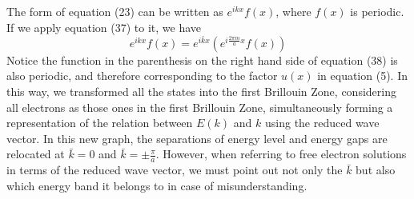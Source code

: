 \documentclass{article}
\begin{document}
The form of equation (23) can be written as $e^{ikx}f(x)$, where $f(x)$ is periodic. If we apply equation (37) to it, we have\begin{equation}
    e^{ikx}f(x)=e^{i\bar{k}x}(e^{i\frac{2\pi{m}}{a}x}f(x))
\end{equation}
Notice the function in the parenthesis on the right hand side of equation (38) is also periodic, and therefore corresponding to the factor $u(x)$ in equation (5). In this way, we transformed all the states into the first Brillouin Zone, considering all electrons as those ones in the first Brillouin Zone, simultaneously forming a representation of the relation between $E(k)$ and $k$ using the reduced wave vector. In this new graph, the separations of energy level and energy gaps are relocated at $\bar{k}=0$ and $\bar{k}=\pm\frac{\pi}{a}$. However, when referring to free electron solutions in terms of the reduced wave vector, we must point out not only the $\bar{k}$ but also which energy band it belongs to in case of misunderstanding.
\end{document}
